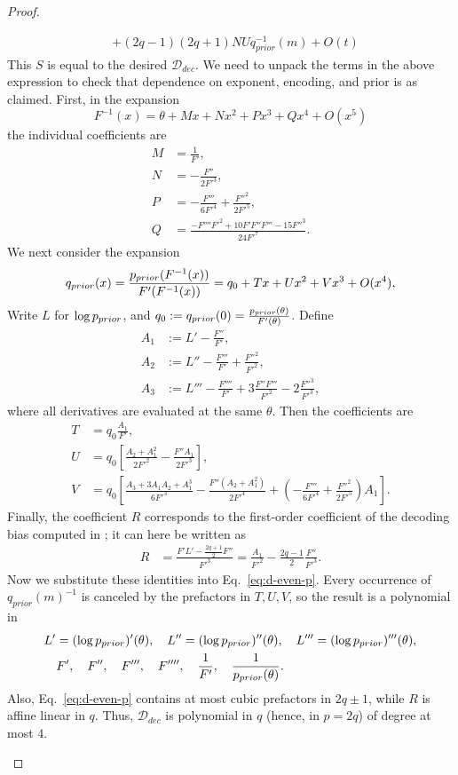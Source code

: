 \begin{proof}
\begin{itemize}
\begin{equation}
\begin{aligned}
& + (2q-1)(2q+1)NUq^{-1}_{prior}(m) + O(t)
\end{aligned}
\end{equation}
This $S$ is equal to the desired $\mathcal{D}_{dec}$.
We need to unpack the terms in the above expression to check that dependence on exponent, encoding, and prior is as claimed.
First, in the expansion
\[
F^{-1}(x)=\theta+Mx+Nx^2+Px^3+Qx^4+O(x^5)
\]
the individual coefficients are
\begin{align*}
M &= \frac{1}{F'},\\
N &= -\frac{F''}{2F'^3},\\
P &= -\frac{F'''}{6F'^4}+\frac{F''^2}{2F'^5},\\
Q &= \frac{-F''''F'^2+10F'F''F'''-15F''^3}{24F'^7}.
\end{align*}
We next consider the expansion 
\[
q_{prior}(x)=\frac{p_{prior}(F^{-1}(x))}{F'(F^{-1}(x))}=q_0+Tx+Ux^2+Vx^3+O(x^4),
\]
Write \(L\) for \(\log p_{prior}\), and $q_0 := q_{prior}(0) = \frac{p_{prior}(\theta)}{F'(\theta)}$. Define
\begin{align*}
A_1 &:= L' - \frac{F''}{F'},\\
A_2 &:= L'' - \frac{F'''}{F'} + \frac{F''^2}{F'^2},\\
A_3 &:= L''' - \frac{F''''}{F'} + 3\frac{F''F'''}{F'^2} - 2\frac{F''^3}{F'^3},
\end{align*}
where all derivatives are evaluated at the same \(\theta\). 
Then the coefficients are
\begin{align*}
T &= q_0\frac{A_1}{F'},\\
U &= q_0\left[\frac{A_2+A_1^2}{2F'^2}-\frac{F''A_1}{2F'^3}\right],\\
V &= q_0\left[\frac{A_3+3A_1A_2+A_1^3}{6F'^3}-\frac{F''(A_2+A_1^2)}{2F'^4}+\left(-\frac{F'''}{6F'^4}+\frac{F''^2}{2F'^5}\right)A_1\right].
\end{align*}
Finally, the coefficient $R$ corresponds to the first-order coefficient of the decoding bias computed in \citet{hahn2024unifying}; it can here be written as
\begin{align*}
R
&= \frac{F' L' - \frac{2q+1}{2}F''}{F'^3}
= \frac{A_1}{F'^2}-\frac{2q-1}{2}\frac{F''}{F'^3}.
\end{align*}
Now we substitute these identities into Eq.~\eqref{eq:d-even-p}. Every occurrence of \(q_{prior}(m)^{-1}\) is canceled by the prefactors in \(T,U,V\), so the result is a polynomial in
\begin{align*}
&L'=(\log p_{prior})'(\theta),\quad L''=(\log p_{prior})''(\theta),\quad L'''=(\log p_{prior})'''(\theta),\\
&\quad F',\quad F'',\quad F''',\quad F'''',\quad \frac1{F'},\quad \frac1{p_{prior}(\theta)}.
\end{align*}
Also, Eq.~\eqref{eq:d-even-p} contains at most cubic prefactors in \(2q\pm1\), while \(R\) is affine linear in \(q\).
Thus, \(\mathcal D_{dec}\) is polynomial in \(q\) (hence, in $p=2q$) of degree at most \(4\).


\end{itemize}
\end{proof}
